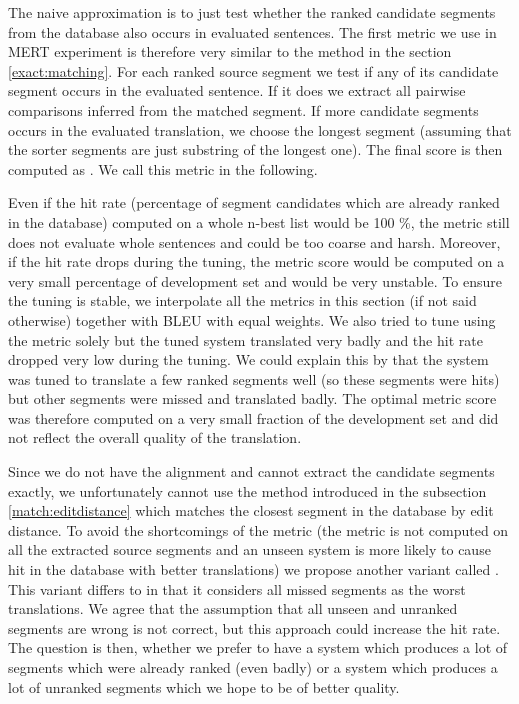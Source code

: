The naive approximation is to just test whether the ranked candidate segments
from the database also occurs in evaluated sentences. The first metric we use
in MERT experiment is therefore very similar to the 
method in the section \ref{exact:matching}. For each ranked source segment we
test if any of its candidate segment occurs in the evaluated sentence. If it
does we extract all pairwise comparisons inferred from the matched segment. If
more candidate segments occurs in the evaluated translation, we choose the
longest segment (assuming that the sorter segments are just substring of the
longest one). The final score is then computed as . We call this metric  in the following.

Even if the hit rate (percentage of segment candidates which are already ranked
in the database) computed on a whole n-best list would be 100 \%, the
 metric still does not evaluate whole sentences and could be
too coarse and harsh. Moreover, if the hit rate drops during the tuning, the
metric score would be computed on a very small percentage of development set
and would be very unstable. To ensure the tuning is stable, we interpolate all
the metrics in this section (if not said otherwise) together with BLEU with
equal weights. We also tried to tune using the  metric
solely but the tuned system translated very badly and the hit rate dropped very
low during the tuning. We could explain this by that the system was tuned to
translate a few ranked segments well (so these segments were hits) but other
segments were missed and translated badly. The optimal metric score was
therefore computed on a very small fraction of the development set and did not
reflect the overall quality of the translation.

Since we do not have the alignment and cannot extract the candidate segments
exactly, we unfortunately cannot use the method introduced in the subsection
\ref{match:editdistance} which matches the closest segment in the database by
edit distance.  To avoid the shortcomings of the  metric
(the metric is not computed on all the extracted source segments and an unseen
system is more likely to cause hit in the database with better translations) we
propose another variant called . This variant differs
to  in that it considers all missed segments as the worst
translations. We agree that the assumption that all unseen and unranked
segments are wrong is not correct, but this approach could increase the hit
rate. The question is then, whether we prefer to have a system which produces a
lot of segments which were already ranked (even badly) or a system which
produces a lot of unranked segments which we hope to be of better quality.

